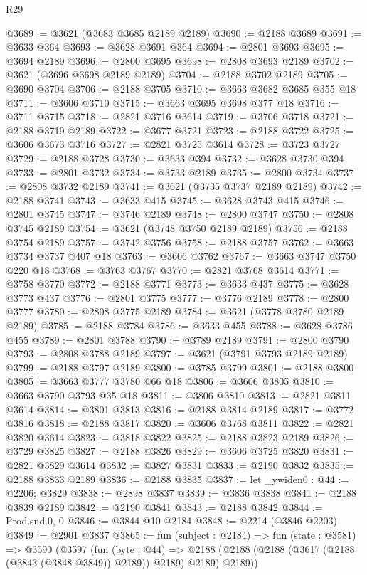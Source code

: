 \begin{lexlean}{R29}
\begin{coremodule}
@3689 := @3621 (@3683 @3685 @2189 @2189)
@3690 := @2188 @3689
@3691 := @3633 @364
@3693 := @3628 @3691 @364
@3694 := @2801 @3693
@3695 := @3694 @2189
@3696 := @2800 @3695
@3698 := @2808 @3693 @2189
@3702 := @3621 (@3696 @3698 @2189 @2189)
@3704 := @2188 @3702 @2189
@3705 := @3690 @3704
@3706 := @2188 @3705
@3710 := @3663 @3682 @3685 @355 @18
@3711 := @3606 @3710
@3715 := @3663 @3695 @3698 @377 @18
@3716 := @3711 @3715
@3718 := @2821 @3716 @3614
@3719 := @3706 @3718
@3721 := @2188 @3719 @2189
@3722 := @3677 @3721
@3723 := @2188 @3722
@3725 := @3606 @3673 @3716
@3727 := @2821 @3725 @3614
@3728 := @3723 @3727
@3729 := @2188 @3728
@3730 := @3633 @394
@3732 := @3628 @3730 @394
@3733 := @2801 @3732
@3734 := @3733 @2189
@3735 := @2800 @3734
@3737 := @2808 @3732 @2189
@3741 := @3621 (@3735 @3737 @2189 @2189)
@3742 := @2188 @3741
@3743 := @3633 @415
@3745 := @3628 @3743 @415
@3746 := @2801 @3745
@3747 := @3746 @2189
@3748 := @2800 @3747
@3750 := @2808 @3745 @2189
@3754 := @3621 (@3748 @3750 @2189 @2189)
@3756 := @2188 @3754 @2189
@3757 := @3742 @3756
@3758 := @2188 @3757
@3762 := @3663 @3734 @3737 @407 @18
@3763 := @3606 @3762
@3767 := @3663 @3747 @3750 @220 @18
@3768 := @3763 @3767
@3770 := @2821 @3768 @3614
@3771 := @3758 @3770
@3772 := @2188 @3771
@3773 := @3633 @437
@3775 := @3628 @3773 @437
@3776 := @2801 @3775
@3777 := @3776 @2189
@3778 := @2800 @3777
@3780 := @2808 @3775 @2189
@3784 := @3621 (@3778 @3780 @2189 @2189)
@3785 := @2188 @3784
@3786 := @3633 @455
@3788 := @3628 @3786 @455
@3789 := @2801 @3788
@3790 := @3789 @2189
@3791 := @2800 @3790
@3793 := @2808 @3788 @2189
@3797 := @3621 (@3791 @3793 @2189 @2189)
@3799 := @2188 @3797 @2189
@3800 := @3785 @3799
@3801 := @2188 @3800
@3805 := @3663 @3777 @3780 @66 @18
@3806 := @3606 @3805
@3810 := @3663 @3790 @3793 @35 @18
@3811 := @3806 @3810
@3813 := @2821 @3811 @3614
@3814 := @3801 @3813
@3816 := @2188 @3814 @2189
@3817 := @3772 @3816
@3818 := @2188 @3817
@3820 := @3606 @3768 @3811
@3822 := @2821 @3820 @3614
@3823 := @3818 @3822
@3825 := @2188 @3823 @2189
@3826 := @3729 @3825
@3827 := @2188 @3826
@3829 := @3606 @3725 @3820
@3831 := @2821 @3829 @3614
@3832 := @3827 @3831
@3833 := @2190 @3832
@3835 := @2188 @3833 @2189
@3836 := @2188 @3835
@3837 := let _ywiden0 : @44 := @2206; @3829
@3838 := @2898 @3837
@3839 := @3836 @3838
@3841 := @2188 @3839 @2189
@3842 := @2190 @3841
@3843 := @2188 @3842
@3844 := Prod.snd.{0, 0}
@3846 := @3844 @10 @2184
@3848 := @2214 (@3846 @2203)
@3849 := @2901 @3837
@3865 := fun (subject : @2184) =>
  fun (state : @3581) =>
  @3590
    (@3597
      (fun (byte : @44) =>
      @2188 (@2188 (@2188 (@3617 (@2188 (@3843 (@3848 @3849)) @2189)) @2189) @2189) @2189))

\end{coremodule}
\end{lexlean}
